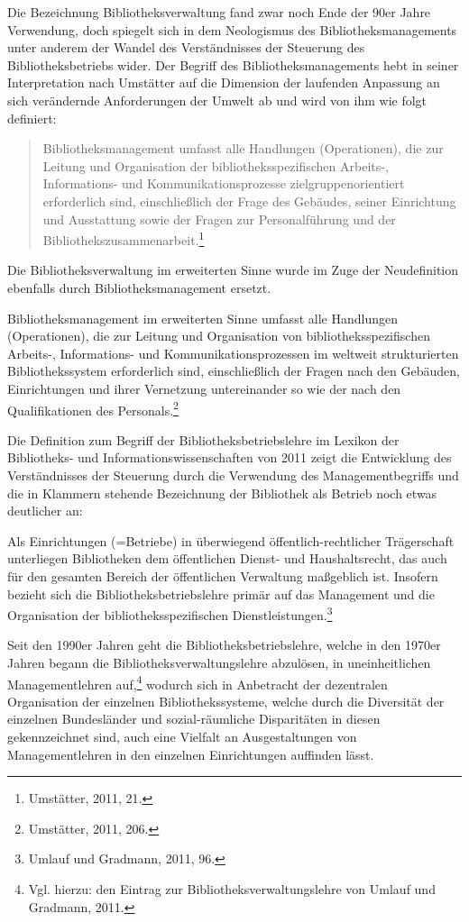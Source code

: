 \documentclass[a4paper,
fontsize=11pt,
oneside,
numbers=noperiodatend,
parskip=half-,
bibliography=totoc,
final
]{scrartcl}
\begin{document}
Die Bezeichnung Bibliotheksverwaltung fand zwar noch Ende der 90er Jahre
Verwendung, doch spiegelt sich in dem Neologismus des
Bibliotheksmanagements unter anderem der Wandel des Verständnisses der
Steuerung des Bibliotheksbetriebs wider. Der Begriff des
Bibliotheksmanagements hebt in seiner Interpretation nach Umstätter auf
die Dimension der laufenden Anpassung an sich verändernde Anforderungen
der Umwelt ab und wird von ihm wie folgt definiert:

\begin{quote}
Bibliotheksmanagement umfasst alle Handlungen (Operationen), die zur
Leitung und Organisation der bibliotheksspezifischen Arbeits-,
Informations- und Kommunikationsprozesse zielgruppenorientiert
erforderlich sind, einschließlich der Frage des Gebäudes, seiner
Einrichtung und Ausstattung sowie der Fragen zur Personalführung und der
Bibliothekszusammenarbeit.\footnote{Umstätter, 2011, 21.}
\end{quote}

Die Bibliotheksverwaltung im erweiterten Sinne wurde im Zuge der
Neudefinition ebenfalls durch Bibliotheksmanagement ersetzt.

Bibliotheksmanagement im erweiterten Sinne umfasst alle Handlungen
(Operationen), die zur Leitung und Organisation von
bibliotheksspezifischen Arbeits-, Informations- und
Kommunikationsprozessen im weltweit strukturierten Bibliothekssystem
erforderlich sind, einschließlich der Fragen nach den Gebäuden,
Einrichtungen und ihrer Vernetzung untereinander so wie der nach den
Qualifikationen des Personals.\footnote{Umstätter, 2011, 206.}

Die Definition zum Begriff der Bibliotheksbetriebslehre im Lexikon der
Bibliotheks- und Informationswissenschaften von 2011 zeigt die
Entwicklung des Verständnisses der Steuerung durch die Verwendung des
Managementbegriffs und die in Klammern stehende Bezeichnung der
Bibliothek als Betrieb noch etwas deutlicher an:

Als Einrichtungen (=Betriebe) in überwiegend öffentlich-rechtlicher
Trägerschaft unterliegen Bibliotheken dem öffentlichen Dienst- und
Haushaltsrecht, das auch für den gesamten Bereich der öffentlichen
Verwaltung maßgeblich ist. Insofern bezieht sich die
Bibliotheksbetriebslehre primär auf das Management und die Organisation
der bibliotheksspezifischen Dienstleistungen.\footnote{Umlauf und
  Gradmann, 2011, 96.}

Seit den 1990er Jahren geht die Bibliotheksbetriebslehre, welche in den
1970er Jahren begann die Bibliotheksverwaltungslehre abzulösen, in
uneinheitlichen Managementlehren auf,\footnote{Vgl. hierzu: den Eintrag
  zur Bibliotheksverwaltungslehre von Umlauf und Gradmann, 2011.}
wodurch sich in Anbetracht der dezentralen Organisation der einzelnen
Bibliothekssysteme, welche durch die Diversität der einzelnen
Bundesländer und sozial-räumliche Disparitäten in diesen gekennzeichnet
sind, auch eine Vielfalt an Ausgestaltungen von Managementlehren in den
einzelnen Einrichtungen auffinden lässt.
\end{document}
